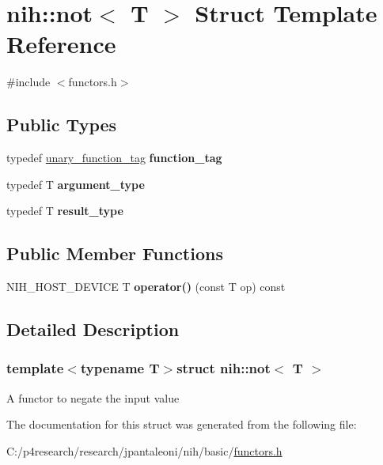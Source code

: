 \hypertarget{structnih_1_1not}{
\section{nih\-:\-:not$<$ \-T $>$ \-Struct \-Template \-Reference}
\label{structnih_1_1not}
}


{\ttfamily \#include $<$functors.\-h$>$}

\subsection*{\-Public \-Types}
\begin{DoxyCompactItemize}
\item 
\hypertarget{structnih_1_1not_aee513f5e55230dff5914ec094ff9f158}{
typedef \hyperlink{structnih_1_1unary__function__tag}{unary\-\_\-function\-\_\-tag} {\bfseries function\-\_\-tag}}
\label{structnih_1_1not_aee513f5e55230dff5914ec094ff9f158}

\item 
\hypertarget{structnih_1_1not_a31584fc11c3ed129808e97ba6b4da11b}{
typedef \-T {\bfseries argument\-\_\-type}}
\label{structnih_1_1not_a31584fc11c3ed129808e97ba6b4da11b}

\item 
\hypertarget{structnih_1_1not_a43cf00850126914d1aec29b225db4b55}{
typedef \-T {\bfseries result\-\_\-type}}
\label{structnih_1_1not_a43cf00850126914d1aec29b225db4b55}

\end{DoxyCompactItemize}
\subsection*{\-Public \-Member \-Functions}
\begin{DoxyCompactItemize}
\item 
\hypertarget{structnih_1_1not_abcb05b87d5d38ba09758f6c9ba1b4297}{
\-N\-I\-H\-\_\-\-H\-O\-S\-T\-\_\-\-D\-E\-V\-I\-C\-E \-T {\bfseries operator()} (const \-T op) const }
\label{structnih_1_1not_abcb05b87d5d38ba09758f6c9ba1b4297}

\end{DoxyCompactItemize}


\subsection{\-Detailed \-Description}
\subsubsection*{template$<$typename T$>$struct nih\-::not$<$ T $>$}

\-A functor to negate the input value 

\-The documentation for this struct was generated from the following file\-:\begin{DoxyCompactItemize}
\item 
\-C\-:/p4research/research/jpantaleoni/nih/basic/\hyperlink{functors_8h}{functors.\-h}\end{DoxyCompactItemize}
